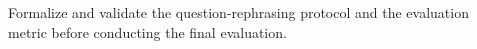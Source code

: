 Formalize and validate the question-rephrasing protocol and the evaluation metric
before conducting the final evaluation. 